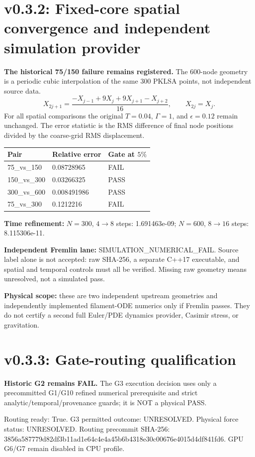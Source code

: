 \documentclass[10pt,a4paper]{article}
\begin{document}
\section{v0.3.2: Fixed-core spatial convergence and independent simulation provider}
\textbf{The historical 75/150 failure remains registered.}
The $600$-node geometry is a periodic cubic interpolation of the same $300$ PKLSA points, not independent source data.
\[
  X_{2j+1}=\frac{-X_{j-1}+9X_j+9X_{j+1}-X_{j+2}}{16},\qquad X_{2j}=X_j.
\]
For all spatial comparisons the original $T=0.04$, $\Gamma=1$, and $\epsilon=0.12$ remain unchanged. The error statistic is the RMS difference of final node positions divided by the coarse-grid RMS displacement.
\begin{center}\begin{tabular}{lll}\toprule
Pair & Relative error & Gate at $5\%$ \\\midrule
75\_vs\_150 & 0.08728965 & FAIL \\
150\_vs\_300 & 0.03266325 & PASS \\
300\_vs\_600 & 0.008491986 & PASS \\
75\_vs\_300 & 0.1212216 & FAIL \\
\bottomrule\end{tabular}\end{center}
\textbf{Time refinement:} $N=300$, $4\to8$ steps: 1.691463e-09; $N=600$, $8\to16$ steps: 8.115306e-11.\par
\textbf{Independent Fremlin lane:} SIMULATION\_NUMERICAL\_FAIL. Source label alone is not accepted: raw SHA-256, a separate C++17 executable, and spatial and temporal controls must all be verified. Missing raw geometry means unresolved, not a simulated pass.\par
\textbf{Physical scope:} these are two independent upstream geometries and independently implemented filament-ODE numerics only if Fremlin passes. They do not certify a second full Euler/PDE dynamics provider, Casimir stress, or gravitation.
\section{v0.3.3: Gate-routing qualification}\textbf{Historic G2 remains FAIL.} The G3 execution decision uses only a precommitted G1/G10 refined numerical prerequisite and strict analytic/temporal/provenance guards; it is NOT a physical PASS. \par Routing ready: True. G3 permitted outcome: UNRESOLVED. Physical force status: UNRESOLVED. Routing precommit SHA-256: 3856a587779d82df3b11ad1e64c4e4a45b6b4318e30c00676e4015d4df841fd6. GPU G6/G7 remain disabled in CPU profile.
\end{document}
